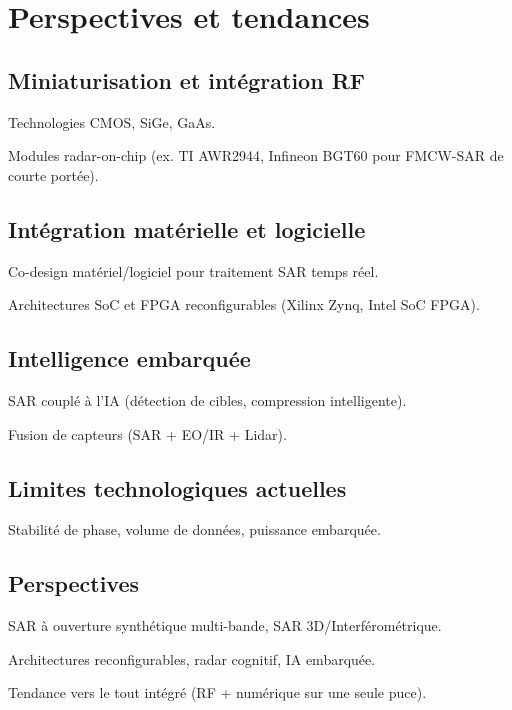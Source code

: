 \section{Perspectives et tendances}\label{SEC:Perspectives et tendances}

\subsection{Miniaturisation et intégration RF}

Technologies CMOS, SiGe, GaAs.

Modules radar-on-chip (ex. TI AWR2944, Infineon BGT60 pour FMCW-SAR de courte portée).


\subsection{Intégration matérielle et logicielle}

Co-design matériel/logiciel pour traitement SAR temps réel.

Architectures SoC et FPGA reconfigurables (Xilinx Zynq, Intel SoC FPGA).


\subsection{Intelligence embarquée}

SAR couplé à l’IA (détection de cibles, compression intelligente).

Fusion de capteurs (SAR + EO/IR + Lidar).


\subsection{Limites technologiques actuelles}


Stabilité de phase, volume de données, puissance embarquée.


\subsection{Perspectives}


SAR à ouverture synthétique multi-bande, SAR 3D/Interférométrique.

Architectures reconfigurables, radar cognitif, IA embarquée.

Tendance vers le tout intégré (RF + numérique sur une seule puce).
